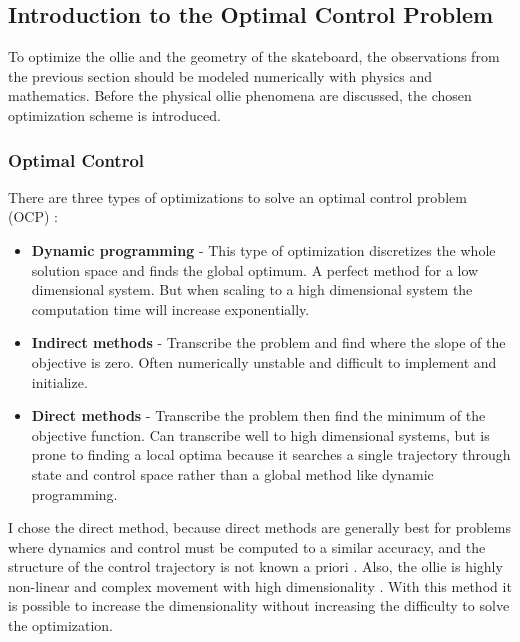 \newpage
\subsection{Introduction to the Optimal Control Problem}
\noindent To optimize the ollie and the geometry of the skateboard, the observations from the previous section should be modeled numerically with physics and mathematics. Before the physical ollie phenomena are discussed, the chosen optimization scheme is introduced. 

\subsubsection{Optimal Control}\label{s_optimalcontrol}
\noindent There are three types of optimizations to solve an optimal control problem (OCP) \cite{kelly_transcription_2017}:
\begin{itemize}
    \item \textbf{Dynamic programming} - This type of optimization discretizes the whole solution space and finds the global optimum. A perfect method for a low dimensional system. But when scaling to a high dimensional system the computation time will increase exponentially. 
    \item \textbf{Indirect methods} - Transcribe the problem and find where the slope of the objective is zero. Often numerically unstable and difficult to implement and initialize.
    \item \textbf{Direct methods} - Transcribe the problem then find the minimum of the objective function. Can transcribe well to high dimensional systems, but is prone to finding a local optima because it searches a single trajectory through state and control space rather than a global method like dynamic programming.
\end{itemize}
I chose the direct method, because direct methods are generally best for problems where dynamics and control must be computed to a similar accuracy, and the structure of the control trajectory is not known a priori \cite{kelly_introduction_2017}. Also, the ollie is highly non-linear and complex movement with high dimensionality . With this method it is possible to increase the dimensionality without increasing the difficulty to solve the optimization. 

